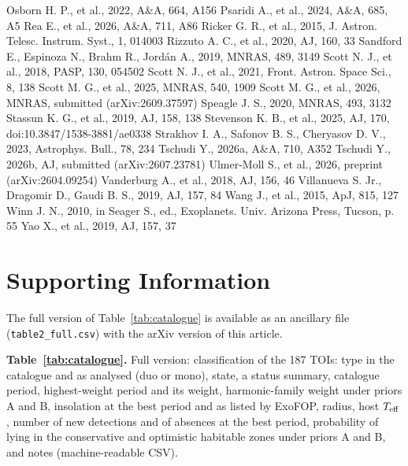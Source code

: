 \documentclass[fleqn,usenatbib]{mnras}
\newcommand{\Teff}{\ensuremath{T_{\rm eff}}}
\begin{document}
\begin{thebibliography}{}
 Osborn H. P., et al., 2022, A\&A, 664, A156
 Psaridi A., et al., 2024, A\&A, 685, A5
 Rea E., et al., 2026, A\&A, 711, A86
 Ricker G. R., et al., 2015, J. Astron. Telesc. Instrum. Syst., 1, 014003
 Rizzuto A. C., et al., 2020, AJ, 160, 33
 Sandford E., Espinoza N., Brahm R., Jordán A., 2019, MNRAS, 489, 3149
 Scott N. J., et al., 2018, PASP, 130, 054502
 Scott N. J., et al., 2021, Front. Astron. Space Sci., 8, 138
 Scott M. G., et al., 2025, MNRAS, 540, 1909
 Scott M. G., et al., 2026, MNRAS, submitted (arXiv:2609.37597)
 Speagle J. S., 2020, MNRAS, 493, 3132
 Stassun K. G., et al., 2019, AJ, 158, 138
 Stevenson K. B., et al., 2025, AJ, 170, doi:10.3847/1538-3881/ae0338
 Strakhov I. A., Safonov B. S., Cheryasov D. V., 2023, Astrophys. Bull., 78, 234
 Tschudi Y., 2026a, A\&A, 710, A352
 Tschudi Y., 2026b, AJ, submitted (arXiv:2607.23781)
 Ulmer-Moll S., et al., 2026, preprint (arXiv:2604.09254)
 Vanderburg A., et al., 2018, AJ, 156, 46
 Villanueva S. Jr., Dragomir D., Gaudi B. S., 2019, AJ, 157, 84
 Wang J., et al., 2015, ApJ, 815, 127
 Winn J. N., 2010, in Seager S., ed., Exoplanets. Univ. Arizona Press, Tucson, p. 55
 Yao X., et al., 2019, AJ, 157, 37
\end{thebibliography}

\section*{Supporting Information}

The full version of Table~\ref{tab:catalogue} is available as an ancillary file (\texttt{table2\_full.csv}) with the arXiv version of this article.

\noindent\textbf{Table~\ref{tab:catalogue}.} Full version: classification of the 187 TOIs: type in the catalogue and as analysed (duo or mono), state, a status summary, catalogue period, highest-weight period and its weight, harmonic-family weight under priors A and B, insolation at the best period and as listed by ExoFOP, radius, host \Teff, number of new detections and of absences at the best period, probability of lying in the conservative and optimistic habitable zones under priors A and B, and notes (machine-readable CSV).

\bsp
\label{lastpage}
\end{document}
